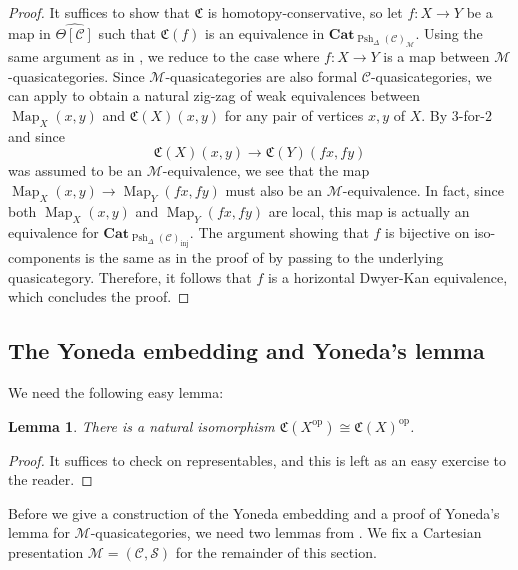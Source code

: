\documentclass[a4paper]{article}
\numberwithin{equation}{subsection}
\theoremstyle{plain}   %
\newtheorem{lemma}[equation]{Lemma}
\theoremstyle{definition}
\theoremstyle{remark}
\theoremstyle{plain}
\newcommand{\op}{\ensuremath{\mathrm{op}}}
\newcommand{\Cat}{\ensuremath{\mathbf{Cat}}}
\DeclareMathOperator{\Map}{Map}
\providecommand{\C}{}
\renewcommand{\C}{\ensuremath{\mathcal{C}}}
\newcommand{\M}{\ensuremath{\mathcal{M}}}
\newcommand{\setS}{\ensuremath{\mathscr{S}}}
\newcommand{\cellset}{\ensuremath{\widehat{\Theta[\mathcal{C}]}}}
\newcommand{\spsh}{\ensuremath{\operatorname{Psh}_\Delta(\mathcal{C})}}
\begin{document}
\begin{proof} It suffices to show that \(\mathfrak{C}\) is homotopy-conservative, so let \(f:X\to Y\) be a map in \(\cellset\) such that \(\mathfrak{C}(f)\) is an equivalence in \(\Cat_{\spsh_{\M}}\). Using the same argument as in , we reduce to the case where \(f:X\to Y\) is a map between \(\M\)-quasicategories.  Since \(\M\)-quasicategories are also formal \(\C\)-quasicategories, we can apply  to obtain a natural zig-zag of weak equivalences between \(\Map_X(x,y)\) and \(\mathfrak{C}(X)(x,y)\) for any pair of vertices \(x,y\) of \(X\).  By \(3\)-for-\(2\) and since \[\mathfrak{C}(X)(x,y) \to \mathfrak{C}(Y)(fx,fy)\] was assumed to be an \(\M\)-equivalence, we see that the map \(\Map_X(x,y)\to \Map_Y(fx,fy)\) must also be an \(\M\)-equivalence.  In fact, since both \(\Map_X(x,y)\) and \(\Map_Y(fx,fy)\) are local, this map is actually an equivalence for \(\Cat_{\spsh_{\mathrm{inj}}}\).  The argument showing that \(f\) is bijective on iso-components is the same as in the proof of  by passing to the underlying quasicategory.  Therefore, it follows that \(f\) is a horizontal Dwyer-Kan equivalence, which concludes the proof.
\end{proof}
\subsection{The Yoneda embedding and Yoneda's lemma}
We need the following easy lemma:
\begin{lemma} There is a natural isomorphism \(\mathfrak{C}(X^\op)\cong \mathfrak{C}(X)^\op\).  
\end{lemma} 
\begin{proof}
	It suffices to check on representables, and this is left as an easy exercise to the reader.
\end{proof}
Before we give a construction of the Yoneda embedding and a proof of Yoneda's lemma for \(\M\)-quasicategories, we need two lemmas from \cite{htt}.   We fix a Cartesian presentation \(\mathcal{M}=(\C,\setS)\) for the remainder of this section.
\end{document}
